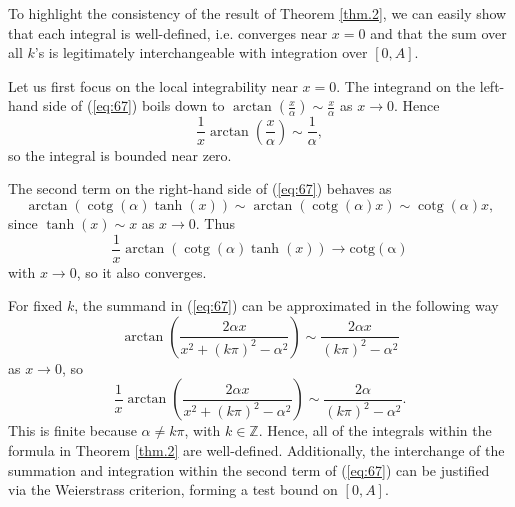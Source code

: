 \documentclass[preprint,12pt,nopreprintline]{elsarticle}
\begin{document}
\vspace{0.1cm}
To highlight the consistency of the result of Theorem \ref{thm.2}, we can easily show that each integral is well-defined, i.e. converges near $x=0$ and that the sum over all $k$’s is legitimately interchangeable with integration over $[0,A]$.

Let us first focus on the local integrability near $x=0$. The integrand on the left-hand side of (\ref{eq:67}) boils down to $\operatorname{arctan}\left(\frac{x}{\alpha}\right)\sim\frac{x}{\alpha}$ as $x\longrightarrow 0$. Hence
\begin{equation}\label{eq:68}
\frac{1}{x}\operatorname{arctan}\left(\frac{x}{\alpha}\right)\sim\frac{1}{\alpha},
\end{equation}
so the integral is bounded near zero.

The second term on the right-hand side of (\ref{eq:67}) behaves as
\begin{equation}\label{eq:69}
\operatorname{arctan}\left(\operatorname{cotg}\left(\alpha\right)\operatorname{tanh}\left(x\right)\right)\sim\operatorname{arctan}\left(\operatorname{cotg}\left(\alpha\right)x\right)\sim\operatorname{cotg}\left(\alpha\right)x,
\end{equation}
since $\operatorname{tanh}\left(x\right)\sim x$ as $x\longrightarrow 0$. Thus
\begin{equation}\label{eq:70}
\frac{1}{x}\operatorname{arctan}\left(\operatorname{cotg}\left(\alpha\right)\operatorname{tanh}\left(x\right)\right)\longrightarrow \operatorname{cotg\left(\alpha\right)}
\end{equation}
with $x\longrightarrow 0$, so it also converges.

For fixed $k$, the summand in (\ref{eq:67}) can be approximated in the following way
\begin{equation}\label{eq:71}
\operatorname{arctan}\left(\frac{2\alpha x}{x^2+\left(k\pi\right)^2-\alpha^2}\right)\sim\frac{2\alpha x}{\left(k\pi\right)^2-\alpha^2}
\end{equation}
as $x\longrightarrow 0$, so
\begin{equation}\label{eq:72}
\frac{1}{x}\operatorname{arctan}\left(\frac{2\alpha x}{x^2+\left(k\pi\right)^2-\alpha^2}\right)\sim\frac{2\alpha}{\left(k\pi\right)^2-\alpha^2}.
\end{equation}
This is finite because $\alpha\neq k\pi$, with $k\in\mathbb{Z}$. Hence, all of the integrals within the formula in Theorem \ref{thm.2} are well-defined. Additionally, the interchange of the summation and integration within the second term of (\ref{eq:67}) can be justified via the Weierstrass criterion, forming a test bound on $[0,A]$. 
\end{document}
